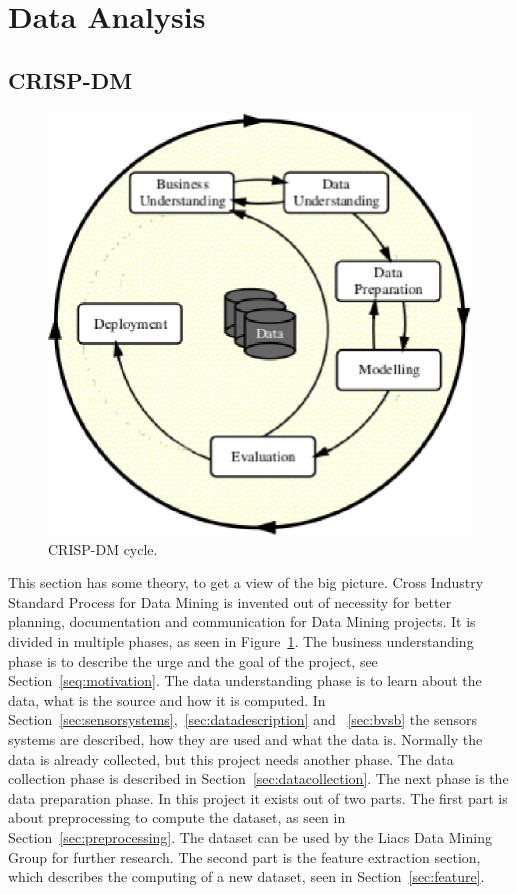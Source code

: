 \section{Data Analysis}
	\subsection{CRISP-DM}
	\label{sec:datamodeling}
	\begin{figure}[h]
		\centering
		\includegraphics[scale=0.75]{crispdm.eps}
					
		\caption{CRISP-DM \cite{wirth2000crisp} cycle.}
		\label{fig:crispdm}

	\end{figure}
	This section has some theory, to get a view of the big picture. Cross Industry Standard Process for Data Mining \cite{wirth2000crisp} is invented out of necessity for better planning, documentation and communication for Data Mining projects. It is divided in multiple phases, as seen in Figure~\ref{fig:crispdm}. The business understanding phase is to describe the urge and the goal of the project, see Section~\ref{seq:motivation}. The data understanding phase is to learn about the data, what is the source and how it is computed. In Section~\ref{sec:sensorsystems},~\ref{sec:datadescription} and ~\ref{sec:bvsb} the sensors systems are described, how they are used and what the data is. Normally the data is already collected, but this project needs another phase. The data collection phase is described in Section~\ref{sec:datacollection}. The next phase is the data preparation phase. In this project it exists out of two parts. The first part is about preprocessing to compute the dataset, as seen in Section~\ref{sec:preprocessing}. The dataset can be used by the Liacs Data Mining Group for further research. The second part is the feature extraction section, which describes the computing of a new dataset, seen in Section~\ref{sec:feature}. 
